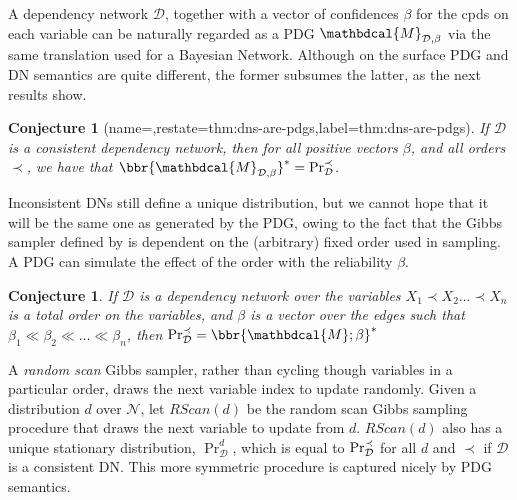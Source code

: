 \documentclass[letterpaper]{article} %
\theoremstyle{plain}
\newtheorem{lemma}[theorem]{Lemma}
\newtheorem{conj}[theorem]{Conjecture}
\theoremstyle{definition}
\theoremstyle{remark}
\newcommand{\begthm}[3][]{\begin{#2}[{name=#1},restate=#3,label=#3]}
\newcommand{\valpha}[1]{#1}
\newcommand\mat[1]{\mathbf{#1}}
\newcommand{\V}{\mathcal V}
\newcommand{\N}{\mathcal N}
\newcommand{\Ed}{\mathcal E}
\newcommand{\dg}[1]{\mathbdcal{#1}}
\newcommand{\IDef}[1]{\mathit{IDef}_{\!#1}}
\newcommand{\PDGof}[1]{{\dg M}_{#1}}
\begin{document}
{%
A dependency network $\mathcal D$, together with a vector of
confidences $\beta$ for the cpds on each variable 
can be naturally regarded as a PDG $\PDGof{\mathcal D, \beta}$ 
via the same translation used for a Bayesian Network.
Although on the surface PDG and DN semantics are quite
different,
the former subsumes the latter, as the next results show.




\begthm{conj}{thm:dns-are-pdgs}
If $\mathcal D$ is a consistent dependency network,
then for all positive vectors $\beta$, and all orders $\prec$, we have that
$\bbr{\PDGof{\mathcal D, \beta}}^* =  \Pr_{\cal D}^\prec$.
\end{conj}

Inconsistent DNs still define a unique distribution, but we cannot hope that it 
will be the same one as generated by the PDG, owing to the fact that
the Gibbs sampler defined by \citeauthor{heckerman2000dependency} is dependent
on the (arbitrary) fixed order used in sampling.
A PDG can simulate the effect of the order with the reliability $\beta$.

\begin{conj}
If $\mathcal D$ is a dependency network over the variables
$X_1 \prec X_2  \ldots  \prec X_n$ is a total order on the variables, and $\beta$ is a vector over the edges
such that  $\beta_1 \ll\beta_2 \ll \ldots \ll \beta_n$, 
then $\Pr_{\cal D}^{\prec} = \bbr{\dg M; \beta}^*$
\end{conj}

A \emph{random scan} Gibbs sampler, rather than cycling though variables in a 
particular order, draws the next variable index to update randomly.
Given a distribution $d$ over $\N$,
let $\mathit{RScan}(d)$ be the random scan Gibbs sampling procedure that draws
the next variable to update from $d$. $\mathit{RScan}(d)$ also has a
unique stationary distribution, $\Pr_{\mathcal D}^d$, which is equal
to $\Pr_{\cal D}^{\prec}$ for all $d$ and $\prec$ if $\mathcal D$ is a
consistent DN. This more symmetric procedure is captured nicely by PDG
semantics. 

}
\end{document}
